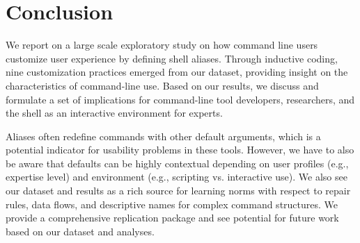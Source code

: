 \section{Conclusion}

We report on a large scale exploratory study on how command line users customize user experience by defining shell aliases.
Through inductive coding, nine customization practices emerged from our dataset, providing insight on the characteristics of command-line use.
Based on our results, we discuss and formulate a set of implications for command-line tool developers, researchers, and the shell as an interactive environment for experts.

Aliases often redefine commands with other default arguments, which is a potential indicator for usability problems in these tools.
However, we have to also be aware that defaults can be highly contextual depending on user profiles (e.g., expertise level) and environment (e.g., scripting vs. interactive use).
We also see our dataset and results as a rich source for learning norms with respect to repair rules, data flows, and descriptive names for complex command structures.
We provide a comprehensive replication package and see potential for future work based on our dataset and analyses.